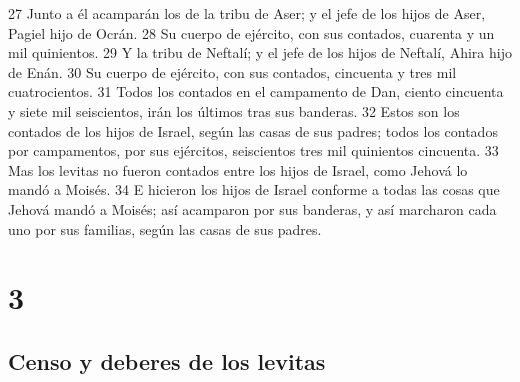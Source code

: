 27 Junto a él acamparán los de la tribu de Aser; y el jefe de los hijos de Aser, Pagiel hijo de Ocrán.
28 Su cuerpo de ejército, con sus contados, cuarenta y un mil quinientos.
29 Y la tribu de Neftalí; y el jefe de los hijos de Neftalí, Ahira hijo de Enán.
30 Su cuerpo de ejército, con sus contados, cincuenta y tres mil cuatrocientos.
31 Todos los contados en el campamento de Dan, ciento cincuenta y siete mil seiscientos, irán los últimos tras sus banderas.
32 Estos son los contados de los hijos de Israel, según las casas de sus padres; todos los contados por campamentos, por sus ejércitos, seiscientos tres mil quinientos cincuenta.
33 Mas los levitas no fueron contados entre los hijos de Israel, como Jehová lo mandó a Moisés.
34 E hicieron los hijos de Israel conforme a todas las cosas que Jehová mandó a Moisés; así acamparon por sus banderas, y así marcharon cada uno por sus familias, según las casas de sus padres.

\chapter{3}

\section*{Censo y deberes de los levitas}


